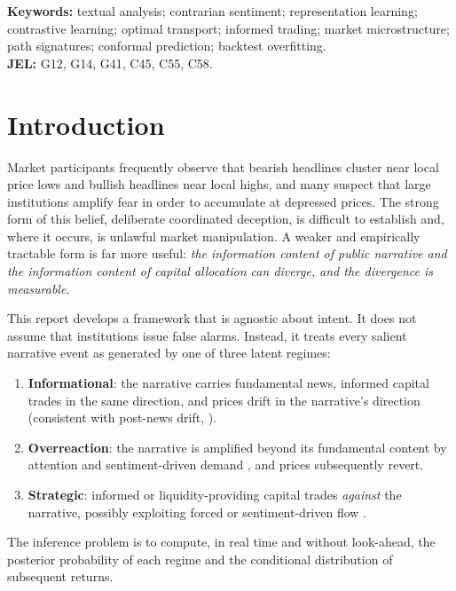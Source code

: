 \documentclass[11pt,a4paper]{article}
\theoremstyle{plain}
\theoremstyle{definition}
\theoremstyle{remark}
\begin{document}
\noindent\textbf{Keywords:} textual analysis; contrarian sentiment; representation learning; contrastive learning; optimal transport; informed trading; market microstructure; path signatures; conformal prediction; backtest overfitting.\\
\textbf{JEL:} G12, G14, G41, C45, C55, C58.

\tableofcontents
\newpage

\section{Introduction}\label{sec:intro}

Market participants frequently observe that bearish headlines cluster near local price lows and bullish headlines near local highs, and many suspect that large institutions amplify fear in order to accumulate at depressed prices. The strong form of this belief, deliberate coordinated deception, is difficult to establish and, where it occurs, is unlawful market manipulation. A weaker and empirically tractable form is far more useful: \emph{the information content of public narrative and the information content of capital allocation can diverge, and the divergence is measurable}.

This report develops a framework that is agnostic about intent. It does not assume that institutions issue false alarms. Instead, it treats every salient narrative event as generated by one of three latent regimes:
\begin{enumerate}[label=(\roman*)]
  \item \textbf{Informational}: the narrative carries fundamental news, informed capital trades in the same direction, and prices drift in the narrative's direction (consistent with post-news drift, \citealp{chan2003}).
  \item \textbf{Overreaction}: the narrative is amplified beyond its fundamental content by attention and sentiment-driven demand \citep{delong1990,barber2008,tetlock2007}, and prices subsequently revert.
  \item \textbf{Strategic}: informed or liquidity-providing capital trades \emph{against} the narrative, possibly exploiting forced or sentiment-driven flow \citep{brunnermeier2005,engelberg2012,kogan2023}.
\end{enumerate}
The inference problem is to compute, in real time and without look-ahead, the posterior probability of each regime and the conditional distribution of subsequent returns.
\end{document}
